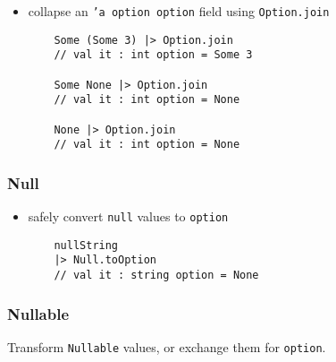 \documentclass{article}
\begin{document}
\begin{itemize}
\item collapse an \texttt{'a option option} field using \texttt{Option.join}
\begin{verbatim}
    Some (Some 3) |> Option.join
    // val it : int option = Some 3
    
    Some None |> Option.join
    // val it : int option = None
    
    None |> Option.join
    // val it : int option = None
\end{verbatim}

\end{itemize}

\subsubsection{Null}

\begin{itemize}

\item safely convert \texttt{null} values to \texttt{option}
\begin{verbatim}
    nullString
    |> Null.toOption
    // val it : string option = None
\end{verbatim}

\end{itemize}

\subsubsection{Nullable}

Transform \texttt{Nullable} values, or exchange them for \texttt{option}.

\end{document}
